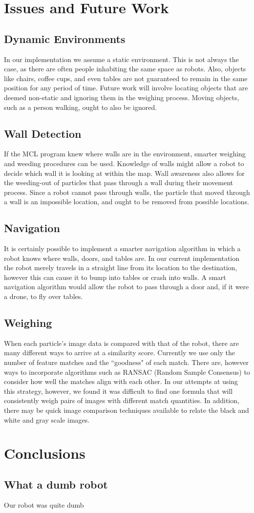 \documentclass[a4paper,11pt]{article}
\begin{document}
\section{Issues and Future Work}
\subsection{Dynamic Environments}
In our implementation we assume a static environment. This is not always the case, as there are often people inhabiting the same space as robots. Also, objects like chairs, coffee cups, and even tables are not guaranteed to remain in the same position for any period of time. Future work will involve locating objects that are deemed non-static and ignoring them in the weighing process. Moving objects, such as a person walking, ought to also be ignored.

\subsection{Wall Detection}
If the MCL program knew where walls are in the environment, smarter weighing and weeding procedures can be used. Knowledge of walls might allow a robot to decide which wall it is looking at within the map. Wall awareness also allows for the weeding-out of particles that pass through a wall during their movement process. Since a robot cannot pass through walls, the particle that moved through a wall is an impossible location, and ought to be removed from possible locations.

\subsection{Navigation}
It is certainly possible to implement a smarter navigation algorithm in which a robot knows where walls, doors, and tables are. In our current implementation the robot merely travels in a straight line from its location to the destination, however this can cause it to bump into tables or crash into walls. A smart navigation algorithm would allow the robot to pass through a door and, if it were a drone, to fly over tables.

\subsection{Weighing}
When each particle's image data is compared with that of the robot, there are many different ways to arrive at a similarity score. Currently we use only the number of feature matches and the ``goodness" of each match. There are, however ways to incorporate algorithms such as RANSAC (Random Sample Consensus) to consider how well the matches align with each other. In our attempts at using this strategy, however, we found it was difficult to find one formula that will consistently weigh pairs of images with different match quantities. In addition, there may be quick image comparison techniques available to relate the black and white and gray scale images.

\section{Conclusions}
\subsection{What a dumb robot}
Our robot was quite dumb








  
\end{document}
